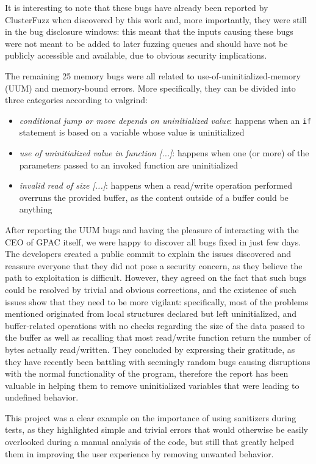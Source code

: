 It is interesting to note that these bugs have already been reported by ClusterFuzz when discovered by this work and, more importantly, they were still in the bug disclosure windows: this meant that the inputs causing these bugs were not meant to be added to later fuzzing queues and should have not be publicly accessible and available, due to obvious security implications.

The remaining 25 memory bugs were all related to use-of-uninitialized-memory (UUM) and memory-bound errors. More specifically, they can be divided into three categories according to valgrind:
\begin{itemize}
    \item \textit{conditional jump or move depends on uninitialized value}: happens when an \verb|if| statement is based on a variable whose value is uninitialized
    \item \textit{use of uninitialized value in function [...]}: happens when one (or more) of the parameters passed to an invoked function are uninitialized
    \item \textit{invalid read of size [...]}: happens when a read/write operation performed overruns the provided buffer, as the content outside of a buffer could be anything
\end{itemize}

After reporting the UUM bugs and having the pleasure of interacting with the CEO of GPAC itself, we were happy to discover all bugs fixed in just few days. The developers created a public commit \cite{gpac_commit} to explain the issues discovered and reassure everyone that they did not pose a security concern, as they believe the path to exploitation is difficult. However, they agreed on the fact that such bugs could be resolved by trivial and obvious corrections, and the existence of such issues show that they need to be more vigilant: specifically, most of the problems mentioned originated from local structures declared but left uninitialized, and buffer-related operations with no checks regarding the size of the data passed to the buffer as well as recalling that most read/write function return the number of bytes actually read/written.
They concluded by expressing their gratitude, as they have recently been battling with seemingly random bugs causing disruptions with the normal functionality of the program, therefore the report has been valuable in helping them to remove uninitialized variables that were leading to undefined behavior.

This project was a clear example on the importance of using sanitizers during tests, as they highlighted simple and trivial errors that would otherwise be easily overlooked during a manual analysis of the code, but still that greatly helped them in improving the user experience by removing unwanted behavior.








